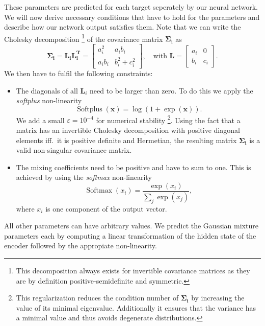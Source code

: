 \documentclass[nobib]{tufte-handout}
\begin{document}
These parameters are predicted for each target seperately by our neural network.
We will now derive necessary conditions that have to hold for the parameters and describe how our network output satisfies them.
Note that we can write the Cholesky decomposition
\footnote{This decomposition always exists for invertible covariance matrices as they are by definition positive-semidefinite and symmetric.}
of the covariance matrix \(\bm{\Sigma_i}\) as
\begin{equation*}
  \bm{\Sigma_i} = \bm{L_i} \bm{L_i^T} =
  \begin{bmatrix}
    a_i^2 & a_ib_i \\
    a_ib_i & b_i^2 + c_i^2
  \end{bmatrix} ,\quad
   \text{with } \bm{L} =
   \begin{bmatrix}
     a_i & 0 \\
     b_i & c_i
   \end{bmatrix}.
\end{equation*}
We then have to fulfil the following constraints:
\begin{itemize}
\item The diagonals of all \(\bm{L}_i\) need to be larger than zero.
  To do this we apply the \textit{softplus} non-linearity
  \begin{equation*}
   \operatorname{Softplus} (\bm{x}) = \log \left( 1 + \exp (\bm{x}) \right).
  \end{equation*}
  We add a small \(\varepsilon = 10^{-4}\) for numerical stability
  \footnote{This regularization reduces the condition number of \(\bm{\Sigma_i}\) by increasing the value of its minimal eigenvalue.
  Additionally it ensures that the variance has a minimal value and thus avoids degenerate distributions.}. %
  Using the fact that a matrix has an invertible Cholesky decomposition with positive diagonal elements iff.\ it is positive definite and Hermetian,
  the resulting matrix \(\bm{\Sigma_i}\) is a valid non-singular covariance matrix.
\item The mixing coefficients need to be positive and have to sum to one.
  This is achieved by using the \textit{softmax} non-linearity
  \begin{equation*}
    \operatorname{Softmax} (x_i) = \frac{\exp (x_i)}{\sum_j \exp (x_j)},
  \end{equation*}
  where \(x_i\) is one component of the output vector.
\end{itemize}
All other parameters can have arbitrary values.
We predict the Gaussian mixture parameters each by computing a linear transformation of the hidden state of the encoder followed by the appropiate non-linearity.
\end{document}
